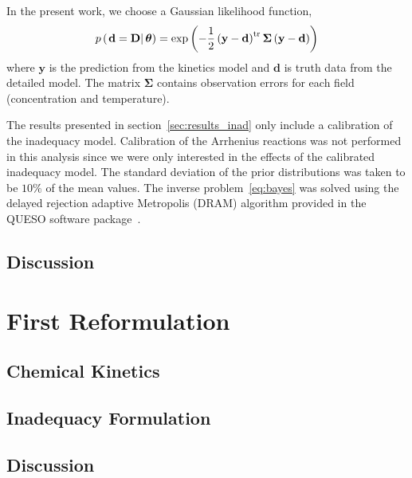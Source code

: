 \documentclass[fontsize=12pt, %
               paper=a4, %
               hyperref]{report}
\begin{document}
  In the present work, we choose a Gaussian likelihood function, 
  \begin{align}
    p\left(\left.\mathbf{d} = \mathbf{D}\right|\boldsymbol{\theta}\right) = 
    \exp\left(-\frac{1}{2}\left(\mathbf{y} - \mathbf{d}\right)^{\mathrm{tr}}\boldsymbol{\Sigma}\left(\mathbf{y} - \mathbf{d}\right)\right) 
    \label{eq:lhood}
  \end{align}
  where $\mathbf{y}$ is the prediction from the kinetics model and $\mathbf{d}$ is 
  truth data from the detailed model.  The matrix $\boldsymbol{\Sigma}$ contains 
  observation errors for each field (concentration and temperature).  
  
  The results presented in section~\ref{sec:results_inad} only include a calibration of 
  the inadequacy model.  Calibration of the Arrhenius reactions was not performed in 
  this analysis since we were only interested in the effects of the calibrated 
  inadequacy model.  The standard deviation of the prior distributions was taken to be 
  $10\%$ of the mean values.  The inverse problem~\eqref{eq:bayes} was solved using the 
  delayed rejection adaptive Metropolis (DRAM) algorithm provided in the QUESO software 
  package~\cite{mcdougall2015parallel, estacio2016queso}.


  \subsection{Discussion} \label{sec:discuss1}

\section{First Reformulation}

  \subsection{Chemical Kinetics}
  \subsection{Inadequacy Formulation}
  \subsection{Discussion}



\end{document}
